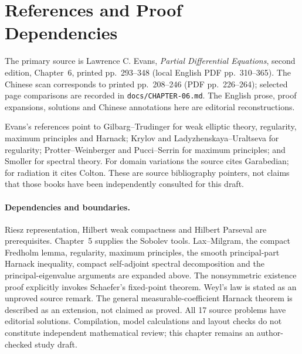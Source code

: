 \Needspace{65mm}
\section{References and Proof Dependencies}
\label{sec:6-7}
The primary source is Lawrence C. Evans, \emph{Partial Differential
Equations}, second edition, Chapter~6, printed pp.~293--348
(local English PDF pp.~310--365). The Chinese scan corresponds to
printed pp.~208--246 (PDF pp.~226--264); selected page comparisons
are recorded in \texttt{docs/CHAPTER-06.md}.
The English prose, proof expansions, solutions and Chinese annotations
here are editorial reconstructions.

Evans's references point to Gilbarg--Trudinger for weak elliptic theory,
regularity, maximum principles and Harnack; Krylov and
Ladyzhenskaya--Uraltseva for regularity; Protter--Weinberger and
Pucci--Serrin for maximum principles; and Smoller for spectral theory.
For domain variations the source cites Garabedian; for radiation it
cites Colton. These are source bibliography pointers, not claims
that those books have been independently consulted for this draft.

\paragraph{Dependencies and boundaries.}
Riesz representation, Hilbert weak compactness and Hilbert Parseval
are prerequisites. Chapter~5 supplies the Sobolev tools.
Lax--Milgram, the compact Fredholm lemma, regularity, maximum principles,
the smooth principal-part Harnack inequality, compact self-adjoint
spectral decomposition and the principal-eigenvalue arguments are
expanded above. The nonsymmetric existence proof explicitly invokes
Schaefer's fixed-point theorem. Weyl's law is stated as an unproved
source remark. The general measurable-coefficient Harnack theorem
is described as an extension, not claimed as proved.
All 17 source problems have editorial solutions.
Compilation, model calculations and layout checks do not constitute
independent mathematical review; this chapter remains an author-checked
study draft.